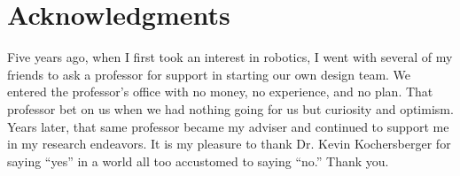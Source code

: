 \chapter*{Acknowledgments}

Five years ago, when I first took an interest in robotics, I went with several of my friends to ask a professor for support in starting our own design team. We entered the professor's office with no money, no experience, and no plan. That professor bet on us when we had nothing going for us but curiosity and optimism. Years later, that same professor became my adviser and continued to support me in my research endeavors. It is my pleasure to thank Dr. Kevin Kochersberger for saying ``yes'' in a world all too accustomed to saying ``no.'' Thank you.

